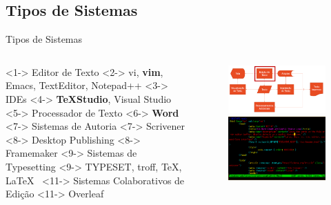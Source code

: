 \documentclass{beamer}
\begin{document}
\subsection{Tipos de Sistemas}
\begin{frame}[shrink=10]{Tipos de Sistemas}
    \begin{columns}
        \begin{column}{0.5\textwidth}
            \begin{outline}
                \1 <1-> Editor de Texto
                \2 <2-> vi, \textbf{vim}, Emacs, TextEditor, Notepad++
                \1 <3-> IDEs
                \2 <4-> \textbf{\TeX Studio}, Visual Studio
                \1 <5-> Processador de Texto 
                \2 <6-> \textbf{Word}
                \1 <7-> Sistemas de Autoria
                \2 <7-> Scrivener
                \1 <8-> Desktop Publishing
                \2 <8-> Framemaker
                \1 <9-> Sistemas de Typesetting
                \2 <9-> TYPESET, troff, \TeX, \LaTeX\
                \1 <11-> Sistemas Colaborativos de Edição
                \2 <11-> Overleaf
            \end{outline}
        \end{column}
        \begin{column}{0.5\textwidth}
            \begin{figure}
                \begin{overprint}
                        \includegraphics[width=0.8\linewidth]{Images/editordetexto.png}
                    \onslide<2>
                        \includegraphics[width=0.8\linewidth]{Images/vim.png}     

\end{overprint}
\end{figure}
\end{column}
\end{columns}
\end{frame}
\end{document}
